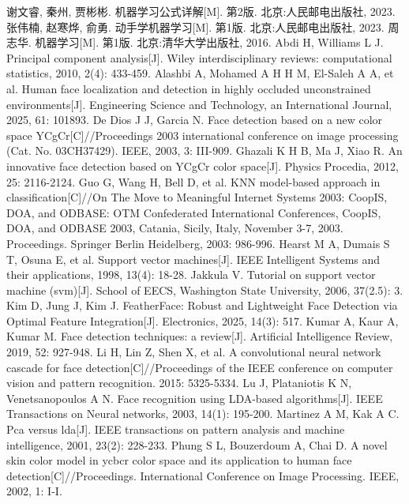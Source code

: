 \documentclass[a4paper, utf8]{ctexart}
\begin{document}
	\begin{thebibliography}{99}
		 谢文睿, 秦州, 贾彬彬. 机器学习公式详解[M]. 第2版. 北京:人民邮电出版社, 2023.
		 张伟楠, 赵寒烨, 俞勇. 动手学机器学习[M]. 第1版. 北京:人民邮电出版社, 2023.
		 周志华. 机器学习[M]. 第1版. 北京:清华大学出版社, 2016.
		 Abdi H, Williams L J. Principal component analysis[J]. Wiley interdisciplinary reviews: computational statistics, 2010, 2(4): 433-459.
		 Alashbi A, Mohamed A H H M, El-Saleh A A, et al. Human face localization and detection in highly occluded unconstrained environments[J]. Engineering Science and Technology, an International Journal, 2025, 61: 101893.
		 De Dios J J, Garcia N. Face detection based on a new color space YCgCr[C]//Proceedings 2003 international conference on image processing (Cat. No. 03CH37429). IEEE, 2003, 3: III-909.
		 Ghazali K H B, Ma J, Xiao R. An innovative face detection based on YCgCr color space[J]. Physics Procedia, 2012, 25: 2116-2124.
		 Guo G, Wang H, Bell D, et al. KNN model-based approach in classification[C]//On The Move to Meaningful Internet Systems 2003: CoopIS, DOA, and ODBASE: OTM Confederated International Conferences, CoopIS, DOA, and ODBASE 2003, Catania, Sicily, Italy, November 3-7, 2003. Proceedings. Springer Berlin Heidelberg, 2003: 986-996.
		 Hearst M A, Dumais S T, Osuna E, et al. Support vector machines[J]. IEEE Intelligent Systems and their applications, 1998, 13(4): 18-28.
		 Jakkula V. Tutorial on support vector machine (svm)[J]. School of EECS, Washington State University, 2006, 37(2.5): 3.
		 Kim D, Jung J, Kim J. FeatherFace: Robust and Lightweight Face Detection via Optimal Feature Integration[J]. Electronics, 2025, 14(3): 517.
		 Kumar A, Kaur A, Kumar M. Face detection techniques: a review[J]. Artificial Intelligence Review, 2019, 52: 927-948.
		 Li H, Lin Z, Shen X, et al. A convolutional neural network cascade for face detection[C]//Proceedings of the IEEE conference on computer vision and pattern recognition. 2015: 5325-5334.
		 Lu J, Plataniotis K N, Venetsanopoulos A N. Face recognition using LDA-based algorithms[J]. IEEE Transactions on Neural networks, 2003, 14(1): 195-200.
		 Martinez A M, Kak A C. Pca versus lda[J]. IEEE transactions on pattern analysis and machine intelligence, 2001, 23(2): 228-233.
		 Phung S L, Bouzerdoum A, Chai D. A novel skin color model in ycbcr color space and its application to human face detection[C]//Proceedings. International Conference on Image Processing. IEEE, 2002, 1: I-I.
	\end{thebibliography}
	
\end{document}
